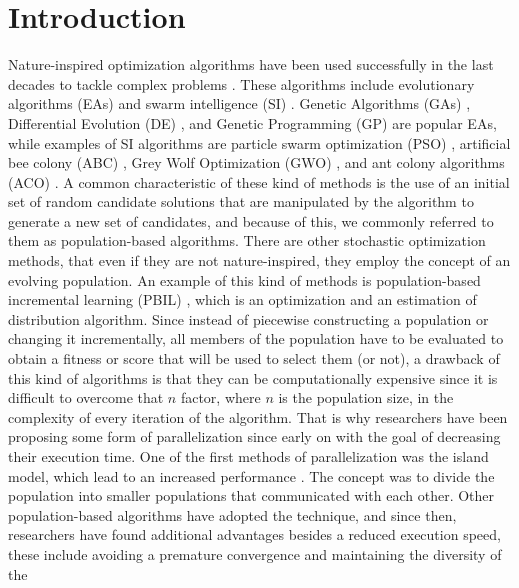 \section{Introduction}
Nature-inspired optimization algorithms have been used successfully in the last
decades to tackle complex problems \cite{yang2014nature}. These
algorithms include evolutionary algorithms (EAs)
\cite{back1996evolutionary} and swarm intelligence (SI)
\cite{kennedy2006swarm}. 
Genetic Algorithms (GAs) 
\cite{holland1992adaptation,eiben2003genetic}, 
Differential Evolution (DE) \cite{karabouga2004simple}, and 
Genetic Programming (GP) \cite{back1996evolutionary} are popular EAs, while examples of SI algorithms 
\cite{kennedy2006swarm} are particle swarm optimization (PSO)
\cite{clerc2010particle}, artificial bee colony (ABC) \cite{karaboga2005idea}, Grey Wolf Optimization
(GWO) \cite{mirjalili2014grey}, and ant colony algorithms (ACO) \cite{dorigo1999ant}.
A common characteristic of these kind of methods is the
use of an initial set of random candidate solutions that are manipulated by the
algorithm to generate a new set of candidates, and because of this, we commonly
referred to them as population-based algorithms. 
There are other stochastic optimization methods, that even if they are not
nature-inspired, they employ the concept of an evolving population. An example
of this kind of methods is population-based incremental learning (PBIL)
\cite{baluja1994population}, which is an optimization and an estimation of
distribution algorithm. Since instead of piecewise constructing a population or changing it
incrementally, all members of the population have to be evaluated to
obtain a fitness or score that will be used to select them (or not), a
drawback of this kind of algorithms is that they can be computationally
expensive since it is difficult to overcome that $n$ factor, where $n$
is the population size, in the complexity of every iteration of the
algorithm. That is why researchers have been proposing some form of
parallelization since early on \cite{muhlenbein1988evolution} with 
the goal of decreasing their execution time. %
One of the first methods of parallelization was the island
model, which lead to an increased performance
\cite{gorges1990explicit,grosso1985computer}. The concept was to divide the
population into smaller populations that communicated with each other. Other
population-based algorithms have adopted the technique, and since then,
researchers have found additional advantages besides a reduced execution speed, 
these include avoiding a premature convergence and maintaining the diversity of the
